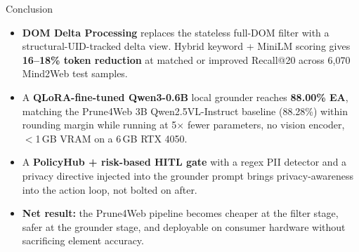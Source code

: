\begin{frame}{Conclusion}
  \small
  \begin{itemize}
    \item \textbf{DOM Delta Processing} replaces the stateless full-DOM filter with a structural-UID-tracked delta view. Hybrid keyword + MiniLM scoring gives \textbf{16--18\% token reduction} at matched or improved Recall@20 across 6,070 Mind2Web test samples.

    \item A \textbf{QLoRA-fine-tuned Qwen3-0.6B} local grounder reaches \textbf{88.00\% EA}, matching the Prune4Web 3B Qwen2.5VL-Instruct baseline (88.28\%) within rounding margin while running at 5$\times$ fewer parameters, no vision encoder, $<$1\,GB VRAM on a 6\,GB RTX 4050.

    \item A \textbf{PolicyHub + risk-based HITL gate} with a regex PII detector and a privacy directive injected into the grounder prompt brings privacy-awareness into the action loop, not bolted on after.

    \item \textbf{Net result:} the Prune4Web pipeline becomes cheaper at the filter stage, safer at the grounder stage, and deployable on consumer hardware without sacrificing element accuracy.
  \end{itemize}
\end{frame}
